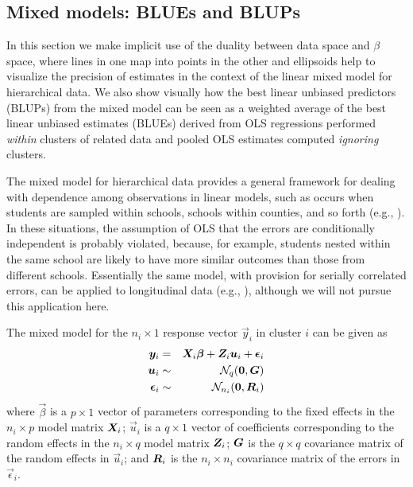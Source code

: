 \subsection{Mixed models: BLUEs and BLUPs}

In this section we make implicit use of the duality between data space and $\beta$
space, where lines in one map into points in the other and ellipsoids help to
visualize the precision of estimates in the context of the linear mixed
model for hierarchical data.  We also show visually how the best linear unbiased
predictors (BLUPs) from the mixed model can be seen as a weighted average
of the best linear unbiased estimates (BLUEs) derived from OLS regressions performed \emph{within} clusters of related data
and pooled OLS estimates computed \emph{ignoring} clusters.

The mixed model for hierarchical data provides a general framework for
dealing with dependence among observations in linear models,
such as occurs when students are sampled within schools, schools within
counties, and so forth
(e.g., \citealp{RaudenbushBryk:2002}). 
In these situations, the assumption of OLS that
the errors are conditionally independent is probably violated,
because, for example, students nested within the same school are
likely to have more similar outcomes than those from different schools. Essentially the same model, with provision for serially correlated errors, can be applied to longitudinal data (e.g., \citealp{LairdWare:1982}), although we will not pursue this application here.


The mixed model for the $n_i \times 1$ response vector $\vec{y}_i$ in
cluster $i$ can be given as
\begin{eqnarray}
 \bm{y}_i & = & \bm{X}_i \bm{\beta} + \bm{Z}_i \bm{u}_i + \bm{\epsilon}_i \label{eq:mixed1} \\
 \bm{u}_i & \sim & \mathcal{N}_q (\bm{0}, \bm{G}) \nonumber\\
 \bm{\epsilon}_i & \sim & \mathcal{N}_{n_i} (\bm{0}, \bm{R}_i) \nonumber
\end{eqnarray}
where
$\vec{\beta}$ is a $p \times 1$ vector of parameters corresponding to the fixed effects
in the $n_i \times p$ model matrix $\bm{X}_i$;
$\vec{u}_i$ is a $q \times 1$ vector of coefficients corresponding to the random effects
in the $n_i \times q$ model matrix $\bm{Z}_i$;
$\bm{G}$ is the $q \times q$ covariance matrix of the random effects in $\vec{u}_i$;
and $\bm{R}_i$ is the $n_i \times n_i$ covariance matrix of the errors in $\vec{\epsilon}_i$.

